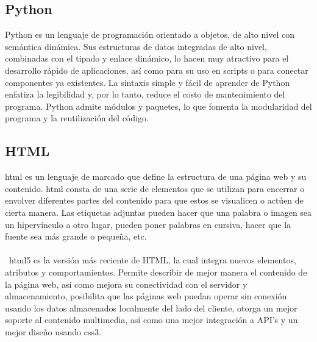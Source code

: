 \documentclass[12pt, a4paper, titlepage]{article}
\begin{document}
	\subsection{Python}
	Python es un lenguaje de programación orientado a objetos, de alto nivel con semántica dinámica. Sus estructuras de datos integradas de alto nivel, combinadas con el tipado y enlace dinámico, lo hacen muy atractivo para el desarrollo rápido de aplicaciones, así como para su uso en scripts o para conectar componentes ya existentes. La sintaxis simple y fácil de aprender de Python enfatiza la legibilidad y, por lo tanto, reduce el costo de mantenimiento del programa. Python admite módulos y paquetes, lo que fomenta la modularidad del programa y la reutilización del código. \cite{refQuesPython}
	\subsection{HTML}
	\acrfull{html} es un lenguaje de marcado que define la estructura de una página web y su contenido. \acrshort{html} consta de una serie de elementos que se utilizan para encerrar o envolver diferentes partes del contenido para que estos se visualicen o actúen de cierta manera. Las etiquetas adjuntas pueden hacer que una palabra o imagen sea un hipervínculo a otro lugar, pueden poner palabras en cursiva, hacer que la fuente sea más grande o pequeña, etc. \cite{refHtml} \\\\\
	\acrshort{html}5 es la versión más reciente de HTML, la cual integra nuevos elementos, atributos y comportamientos. Permite describir de mejor manera el contenido de la página web, así como mejora su conectividad con el servidor y almacenamiento, posibilita que las páginas web puedan operar sin conexión usando los datos almacenados localmente del lado del cliente, otorga un mejor soporte al contenido multimedia, así como una mejor integración a API's y un mejor diseño usando \acrshort{css}3.	\cite{refHtml2}
\end{document}
